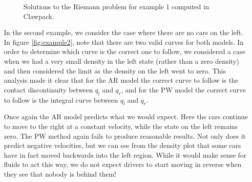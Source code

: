 \documentclass{article}
\begin{document}
\begin{figure}[H]
 \centering
 \caption[Optional caption for list of figures]
 {Solutions to the Riemann problem for example 1 computed in Clawpack.}
  \label{fig:example1_PW}
\end{figure}

In the second example, we consider the case where there are no cars on the left. In figure \ref{fig:example2}, note that there are two valid curves for both models. In order to determine which curve is the correct one to follow, we considered a case when we had a very small density in the left state (rather than a zero density) and then considered the limit as the density on the left went to zero. This analysis made it clear that for the AR model the correct curve to follow is the contact discontinuity between $q_l$ and $q_r$, and for the PW model the correct curve to follow is the integral curve between $q_l$ and $q_r$.

Once again the AR model predicts what we would expect.  Here the cars continue to move to the right at a constant velocity, while the state on the left remains zero. The PW method again fails to produce reasonable results.  Not only does it predict negative velocities, but we can see from the density plot that some cars have in fact moved backwards into the left region.  While it would make sense for fluids to act this way, we do not expect drivers to start moving in reverse when they see that nobody is behind them!
\end{document}
